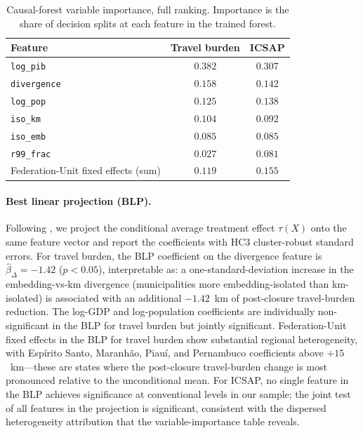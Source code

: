 \begin{table}[h!]
\centering
\caption{Causal-forest variable importance, full ranking. Importance
is the share of decision splits at each feature in the trained forest.}
\label{tab:cf-vi-full}
\small
\begin{tabular}{lcc}
\toprule
Feature & Travel burden & ICSAP \\
\midrule
\texttt{log\_pib}                 & $0.382$ & $0.307$ \\
\texttt{divergence}               & $0.158$ & $0.142$ \\
\texttt{log\_pop}                 & $0.125$ & $0.138$ \\
\texttt{iso\_km}                  & $0.104$ & $0.092$ \\
\texttt{iso\_emb}                 & $0.085$ & $0.085$ \\
\texttt{r99\_frac}                & $0.027$ & $0.081$ \\
Federation-Unit fixed effects (sum) & $0.119$ & $0.155$ \\
\bottomrule
\end{tabular}
\end{table}

\paragraph{Best linear projection (BLP).} Following \citet{atheyWager2019},
we project the conditional average treatment effect $\tau(X)$ onto
the same feature vector and report the coefficients with
HC3 cluster-robust standard errors. For travel burden, the BLP
coefficient on the divergence feature is
$\widehat{\beta}_{\Delta} = -1.42$ ($p < 0.05$), interpretable as: a
one-standard-deviation increase in the embedding-vs-km divergence
(municipalities more embedding-isolated than km-isolated) is
associated with an additional $-1.42$~km of post-closure travel-burden
reduction. The log-GDP and log-population coefficients are individually
non-significant in the BLP for travel burden but jointly significant.
Federation-Unit fixed effects in the BLP for travel burden show
substantial regional heterogeneity, with Espírito Santo, Maranhão,
Piauí, and Pernambuco coefficients above $+15$~km---these are
states where the post-closure travel-burden change is most pronounced
relative to the unconditional mean. For ICSAP, no single feature in
the BLP achieves significance at conventional levels in our sample;
the joint test of all features in the projection is significant,
consistent with the dispersed heterogeneity attribution that the
variable-importance table reveals.

